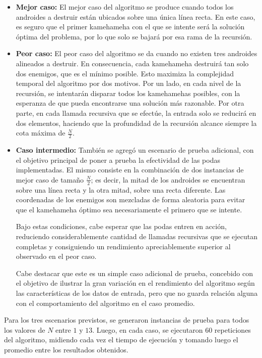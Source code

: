             \begin{itemize}
                \item \textbf{Mejor caso:} El mejor caso del algoritmo se produce cuando todos los androides a destruir están ubicados sobre una única línea recta. En este caso, es seguro que el primer kamehameha con el que se intente será la solución óptima del problema, por lo que solo se bajará por esa rama de la recursión.

                \item \textbf{Peor caso:} El peor caso del algoritmo se da cuando no existen tres androides alineados a destruir. En consecuencia, cada kamehameha destruirá tan solo dos enemigos, que es el mínimo posible. Esto maximiza la complejidad temporal del algoritmo por dos motivos. Por un lado, en cada nivel de la recursión, se intentarán disparar todos los kamehamehas posibles, con la esperanza de que pueda encontrarse una solución más razonable. Por otra parte, en cada llamada recursiva que se efectúe, la entrada solo se reducirá en dos elementos, haciendo que la profundidad de la recursión alcance siempre la cota máxima de $\frac{N}{2}$.

                \item \textbf{Caso intermedio:} También se agregó un escenario de prueba adicional, con el objetivo principal de poner a prueba la efectividad de las podas implementadas. El mismo consiste en la combinación de dos instancias de mejor caso de tamaño $\frac{N}{2}$; es decir, la mitad de los androides se encuentran sobre una línea recta y la otra mitad, sobre una recta diferente. Las coordenadas de los enemigos son mezcladas de forma aleatoria para evitar que el kamehameha óptimo sea necesariamente el primero que se intente.
                
                Bajo estas condiciones, cabe esperar que las podas entren en acción, reduciendo considerablemente cantidad de llamadas recursivas que se ejecutan completas y consiguiendo un rendimiento apreciablemente superior al observado en el peor caso.

                Cabe destacar que este es un simple caso adicional de prueba, concebido con el objetivo de ilustrar la gran variación en el rendimiento del algoritmo según las características de los datos de entrada, pero que no guarda relación alguna con el comportamiento del algoritmo en el caso promedio.
            \end{itemize}

            Para los tres escenarios previstos, se generaron instancias de prueba para todos los valores de $N$ entre $1$ y $13$. Luego, en cada caso, se ejecutaron $60$ repeticiones del algoritmo, midiendo cada vez el tiempo de ejecución y tomando luego el promedio entre los resultados obtenidos.

